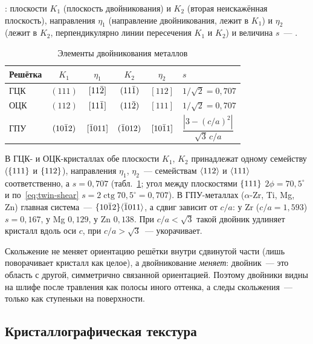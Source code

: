 \begin{opredelenie}
: плоскости $K_1$ (плоскость двойникования)
и $K_2$ (вторая неискажённая плоскость), направления $\eta_1$ (направление
двойникования, лежит в $K_1$) и $\eta_2$ (лежит в $K_2$, перпендикулярно
линии пересечения $K_1$ и $K_2$) и величина $s$~— .
\end{opredelenie}

\begin{table}[ht]
\centering
\caption{Элементы двойникования металлов}
\label{tab:twinning}
\small
\begin{tabular}{@{}lccccl@{}}
\toprule
Решётка & $K_1$ & $\eta_1$ & $K_2$ & $\eta_2$ & $s$\\
\midrule
ГЦК & $(111)$ & $[11\bar{2}]$ & $(11\bar{1})$ & $[112]$ & $1/\sqrt2=0{,}707$\\
ОЦК & $(112)$ & $[11\bar{1}]$ & $(11\bar{2})$ & $[111]$ & $1/\sqrt2=0{,}707$\\
ГПУ & $(10\bar{1}2)$ & $[\bar{1}011]$ & $(\bar{1}012)$ & $[10\bar{1}1]$ & $\dfrac{|3-(c/a)^2|}{\sqrt3\,c/a}$\\
\bottomrule
\end{tabular}
\end{table}

В ГЦК- и ОЦК-кристаллах обе плоскости $K_1$, $K_2$ принадлежат одному
семейству ($\{111\}$ и $\{112\}$), направления $\eta_1$, $\eta_2$~—
семействам $\langle 112\rangle$ и $\langle 111\rangle$ соответственно, а $s=0{,}707$
(табл.~\ref{tab:twinning}; угол между плоскостями $\{111\}$
$2\phi=70{,}5^\circ$ и по~\eqref{eq:twin-shear} $s=2\operatorname{ctg}70{,}5^\circ=0{,}707$).
В ГПУ-металлах ($\alpha$-Zr, Ti, Mg, Zn) главная система~—
$\{10\bar{1}2\}\langle \bar{1}011\rangle$, а сдвиг зависит от $c/a$: у Zr
($c/a=1{,}593$) $s=0{,}167$, у Mg $0{,}129$, у Zn $0{,}138$. При
$c/a<\sqrt3$ такой двойник удлиняет кристалл вдоль оси $c$, при $c/a>\sqrt3$~—
укорачивает.

\begin{vnimanie}
Скольжение не меняет ориентацию решётки внутри сдвинутой части (лишь
поворачивает кристалл как целое), а двойникование \emph{меняет}: двойник~—
это область с другой, симметрично связанной ориентацией. Поэтому
двойники видны на шлифе после травления как полосы иного оттенка, а
следы скольжения~— только как ступеньки на поверхности.
\end{vnimanie}

\subsection{Кристаллографическая текстура}\label{ssec:texture}

